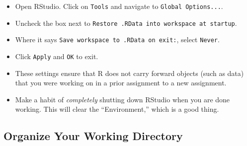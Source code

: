 \documentclass[
]{article}
\providecommand{\tightlist}{%
  \setlength{\itemsep}{0pt}\setlength{\parskip}{0pt}}
\begin{document}
\begin{itemize}
\tightlist
\item
  Open RStudio. Click on \texttt{Tools} and navigate to
  \texttt{Global\ Options...}.
\item
  Uncheck the box next to
  \texttt{Restore\ .RData\ into\ workspace\ at\ startup}.
\item
  Where it says \texttt{Save\ workspace\ to\ .RData\ on\ exit:}, select
  \texttt{Never}.
\item
  Click \texttt{Apply} and \texttt{OK} to exit.
\item
  These settings ensure that R does not carry forward objects (such as
  data) that you were working on in a prior assignment to a new
  assignment.
\item
  Make a habit of \emph{completely} shutting down RStudio when you are
  done working. This will clear the ``Environment,'' which is a good
  thing.
\end{itemize}

\hypertarget{organize-your-working-directory}{%
\subsection{Organize Your Working
Directory}\label{organize-your-working-directory}}
\end{document}
